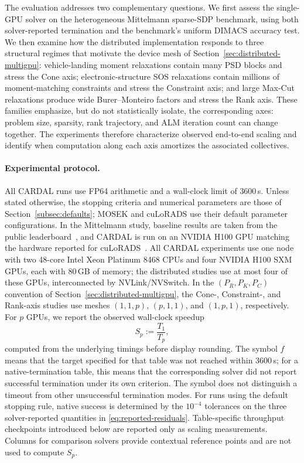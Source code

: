 \documentclass[11pt]{article}
\theoremstyle{definition}
\theoremstyle{remark}
\newcommand{\name}{\textsc{CARDAL}\xspace}
\begin{document}
The evaluation addresses two complementary questions.  We first assess the
single-GPU solver on the heterogeneous Mittelmann sparse-SDP benchmark, using
both solver-reported termination and the benchmark's uniform DIMACS accuracy
test.  We then examine how the distributed implementation responds to three
structural regimes that motivate the device mesh of
Section~\ref{sec:distributed-multigpu}: vehicle-landing moment relaxations contain many
PSD blocks and stress the Cone axis; electronic-structure SOS relaxations
contain millions of moment-matching constraints and stress the Constraint
axis; and large Max-Cut relaxations produce wide Burer--Monteiro factors and
stress the Rank axis.  These families emphasize, but do not statistically
isolate, the corresponding axes: problem size, sparsity, rank trajectory, and
ALM iteration count can change together.  The experiments therefore
characterize observed end-to-end scaling and identify when computation along
each axis amortizes the associated collectives.

\paragraph{Experimental protocol.}
All \name{} runs use FP64 arithmetic and a wall-clock limit of $3600$\,s.
Unless stated otherwise, the stopping criteria and numerical parameters are
those of Section~\ref{subsec:defaults}; MOSEK and cuLoRADS use their default
parameter configurations.  In the
Mittelmann study, baseline
results are taken from the public leaderboard~\cite{Mittelmann}, and
\name{} is run on an NVIDIA H100 GPU matching the hardware reported for
cuLoRADS~\cite{cuLoRADS}.  All \name{} experiments use one node with two
48-core Intel Xeon Platinum 8468 CPUs and four NVIDIA H100 SXM GPUs, each
with $80$\,GB of memory; the distributed studies use at most four of these
GPUs, interconnected by NVLink/NVSwitch.  In the $(P_R,P_K,P_C)$ convention of
Section~\ref{sec:distributed-multigpu}, the Cone-, Constraint-, and Rank-axis
studies use meshes $(1,1,p)$, $(p,1,1)$, and $(1,p,1)$, respectively.
For $p$ GPUs, we report the observed wall-clock speedup
\begin{equation}
  S_p:=\frac{T_1}{T_p},
  \label{eq:experimental-speedup}
\end{equation}
computed from the underlying timings before display rounding.  The symbol
$f$ means that the target specified for that table was not reached within
$3600$\,s; for a native-termination table, this means that the corresponding
solver did not report successful termination under its own criterion.  The
symbol does not distinguish a timeout from other unsuccessful termination
modes.  For runs using the default stopping rule, native success is determined
by the $10^{-4}$ tolerances on the three solver-reported quantities in
\eqref{eq:reported-residuals}.
Table-specific throughput checkpoints introduced below are reported only as
scaling measurements.
Columns for comparison solvers provide contextual reference points and are
not used to compute $S_p$.
\end{document}
